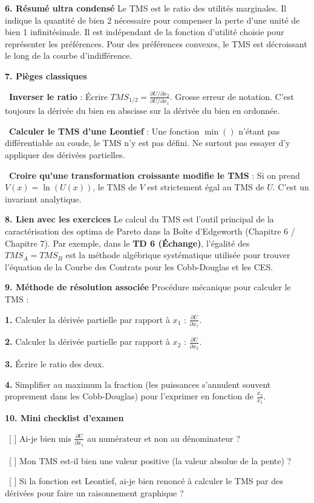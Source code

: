 \documentclass[11pt, a4paper]{report}
\begin{document}
\textbf{6. Résumé ultra condensé}
Le TMS est le ratio des utilités marginales. Il indique la quantité de bien 2 nécessaire pour compenser la perte d'une unité de bien 1 infinitésimale. Il est indépendant de la fonction d'utilité choisie pour représenter les préférences. Pour des préférences convexes, le TMS est décroissant le long de la courbe d'indifférence.

\textbf{7. Pièges classiques}
\par \textbullet\ \textbf{Inverser le ratio} : Écrire $TMS_{1/2} = \frac{\partial U / \partial x_2}{\partial U / \partial x_1}$. Grosse erreur de notation. C'est toujours la dérivée du bien en abscisse sur la dérivée du bien en ordonnée.
\par \textbullet\ \textbf{Calculer le TMS d'une Leontief} : Une fonction $\min()$ n'étant pas différentiable au coude, le TMS n'y est pas défini. Ne surtout pas essayer d'y appliquer des dérivées partielles.
\par \textbullet\ \textbf{Croire qu'une transformation croissante modifie le TMS} : Si on prend $V(x) = \ln(U(x))$, le TMS de $V$ est strictement égal au TMS de $U$. C'est un invariant analytique.

\textbf{8. Lien avec les exercices}
Le calcul du TMS est l'outil principal de la caractérisation des optima de Pareto dans la Boîte d'Edgeworth (Chapitre 6 / Chapitre 7). Par exemple, dans le \textbf{TD 6 (Échange)}, l'égalité des $TMS_A = TMS_B$ est la méthode algébrique systématique utilisée pour trouver l'équation de la Courbe des Contrats pour les Cobb-Douglas et les CES. 

\textbf{9. Méthode de résolution associée}
Procédure mécanique pour calculer le TMS :
\par \textbf{1.} Calculer la dérivée partielle par rapport à $x_1$ : $\frac{\partial U}{\partial x_1}$.
\par \textbf{2.} Calculer la dérivée partielle par rapport à $x_2$ : $\frac{\partial U}{\partial x_2}$.
\par \textbf{3.} Écrire le ratio des deux.
\par \textbf{4.} Simplifier au maximum la fraction (les puissances s'annulent souvent proprement dans les Cobb-Douglas) pour l'exprimer en fonction de $\frac{x_2}{x_1}$.

\textbf{10. Mini checklist d’examen}
\par \textbullet\ [ ] Ai-je bien mis $\frac{\partial U}{\partial x_1}$ au numérateur et non au dénominateur ?
\par \textbullet\ [ ] Mon TMS est-il bien une valeur positive (la valeur absolue de la pente) ?
\par \textbullet\ [ ] Si la fonction est Leontief, ai-je bien renoncé à calculer le TMS par des dérivées pour faire un raisonnement graphique ?
\newpage
\end{document}
